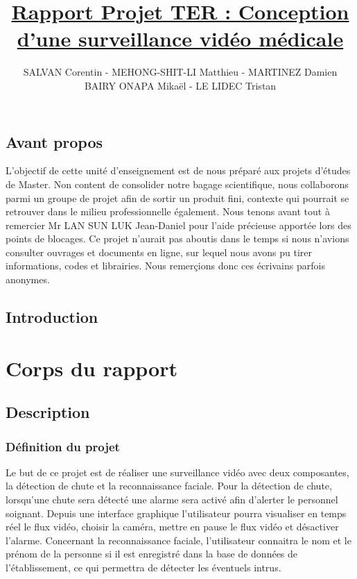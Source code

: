 \documentclass[a4paper]{report}
\author{SALVAN Corentin - MEHONG-SHIT-LI Matthieu - MARTINEZ Damien \\ BAIRY ONAPA Mikaël - LE LIDEC Tristan}
\title{\underline{Rapport Projet TER : Conception d'une surveillance vidéo médicale}}
\begin{document}
    \maketitle
      
    \chapter*{Avant propos}

    L'objectif de cette unité d'enseignement est de nous préparé aux projets d'études de Master.
    Non content de consolider notre bagage scientifique, nous collaborons parmi un groupe de projet
    afin de sortir un produit fini, contexte qui pourrait se retrouver dans le milieu professionnelle
    également.
    Nous tenons avant tout à remercier Mr LAN SUN LUK Jean-Daniel pour l'aide précieuse apportée
    lors des points de blocages. Ce projet n'aurait pas aboutis dans le temps si nous n'avions consulter
    ouvrages et documents en ligne, sur lequel nous avons pu tirer informations, codes et librairies.
    Nous remerçions donc ces écrivains parfois anonymes.
    
    \chapter*{Introduction}
    
    
    \tableofcontents
    
    \part{Corps du rapport}
    
    \chapter{Description}
        \section{Définition du projet}
    Le but de ce projet est de réaliser une surveillance vidéo avec deux composantes, la détection de chute et la reconnaissance faciale.
    Pour la détection de chute, lorsqu'une chute sera détecté une alarme sera activé afin d'alerter le personnel soignant. Depuis une interface graphique l'utilisateur pourra visualiser en temps réel le flux vidéo, choisir la caméra, mettre en pause le flux vidéo et désactiver l'alarme. Concernant la reconnaissance faciale, l'utilisateur connaitra le nom et le prénom de la personne si il est enregistré dans la base de données de l'établissement, ce qui permettra de détecter les éventuels intrus.
\end{document}

